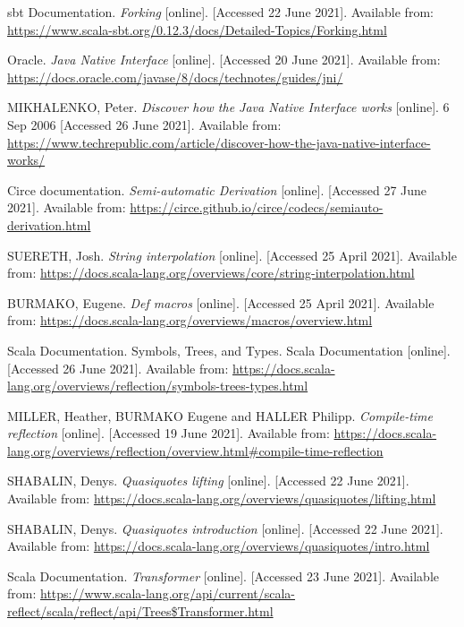 \documentclass[thesis=B,english]{FITthesis}[2019/12/23]
\begin{document}
\begin{thebibliography}{9}
sbt Documentation.
\textit {Forking} [online]. [Accessed 22 June 2021]. Available from:
\url{https://www.scala-sbt.org/0.12.3/docs/Detailed-Topics/Forking.html}

Oracle.
\textit{Java Native Interface} [online]. [Accessed 20 June 2021]. Available from:
\url{https://docs.oracle.com/javase/8/docs/technotes/guides/jni/}

MIKHALENKO, Peter.
\textit{Discover how the Java Native Interface works} [online]. 6 Sep 2006  [Accessed 26 June 2021]. Available from:
\url{https://www.techrepublic.com/article/discover-how-the-java-native-interface-works/}

Circe documentation.
\textit{Semi-automatic Derivation}
[online]. [Accessed 27 June 2021]. Available from:
\url{https://circe.github.io/circe/codecs/semiauto-derivation.html}

SUERETH, Josh. 
\textit {String interpolation} [online]. [Accessed 25 April 2021]. Available from: \url{https://docs.scala-lang.org/overviews/core/string-interpolation.html}

BURMAKO, Eugene. 
\textit {Def macros} [online]. [Accessed 25 April 2021]. Available from: \url{https://docs.scala-lang.org/overviews/macros/overview.html}

Scala Documentation.
Symbols, Trees, and Types. Scala Documentation [online]. [Accessed 26 June 2021]. Available from: \url{https://docs.scala-lang.org/overviews/reflection/symbols-trees-types.html} 


MILLER, Heather, BURMAKO Eugene and HALLER Philipp.
\textit {Compile-time reflection} [online]. [Accessed 19 June 2021]. Available from: \url{https://docs.scala-lang.org/overviews/reflection/overview.html\#compile-time-reflection}

SHABALIN, Denys.
\textit {Quasiquotes lifting} [online]. [Accessed 22 June 2021]. Available from:
\url{https://docs.scala-lang.org/overviews/quasiquotes/lifting.html}

SHABALIN, Denys.
\textit {Quasiquotes introduction} [online]. [Accessed 22 June 2021]. Available from:
\url{https://docs.scala-lang.org/overviews/quasiquotes/intro.html}

Scala Documentation.
\textit {Transformer} [online]. [Accessed 23 June 2021]. Available from:
\url{https://www.scala-lang.org/api/current/scala-reflect/scala/reflect/api/Trees$Transformer.html}


\end{thebibliography}
\end{document}
